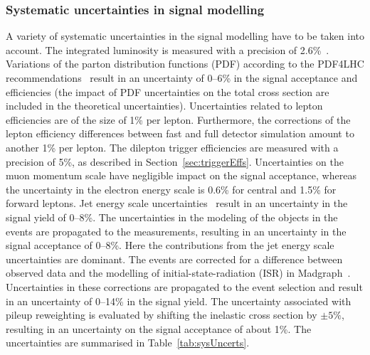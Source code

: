 \subsubsection{Systematic uncertainties in signal modelling}
A variety of systematic uncertainties in the signal modelling have to be taken into account. The integrated luminosity is measured with a precision of 2.6\%~\cite{CMS-PAS-LUM-13-001}. Variations of the parton distribution functions (PDF) according to the PDF4LHC recommendations~\cite{Alekhin:2011sk,Botje:2011sn,Ball:2012cx,Martin:2009iq,Lai:2010vv} result in an uncertainty of 0--6\% in the signal acceptance and efficiencies (the impact of PDF uncertainties on the total cross section are included in the theoretical uncertainties). Uncertainties related to lepton efficiencies are of the size of 1\% per lepton. Furthermore, the corrections of the lepton efficiency differences between fast and full detector simulation amount to another 1\% per lepton. The dilepton trigger efficiencies are measured with a precision of 5\%, as described in Section~\ref{sec:triggerEffs}. Uncertainties on the muon momentum scale have negligible impact on the signal acceptance, whereas the uncertainty in the electron energy scale is 0.6\% for central and 1.5\% for forward leptons. Jet energy scale uncertainties~\cite{1748-0221-6-11-P11002} result in an uncertainty in the signal yield of 0--8\%. The uncertainties in the modeling of the objects in the events are propagated to the \MET measurements, resulting in an uncertainty in the signal acceptance of 0--8\%. Here the contributions from the jet energy scale uncertainties are dominant. The events are corrected for a difference between observed data and the modelling of initial-state-radiation (ISR) in Madgraph~\cite{Chatrchyan:2013xna}. Uncertainties in these corrections are propagated to the event selection and result in an uncertainty of 0--14\% in the signal yield.
The uncertainty associated with pileup reweighting is evaluated by shifting the inelastic cross section by $\pm5\%$, resulting in an uncertainty on the signal acceptance of about 1\%. The uncertainties are summarised in Table~\ref{tab:sysUncerts}.

